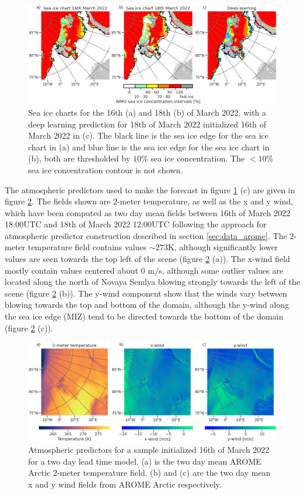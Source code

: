 \documentclass[../main/thesis.tex]{subfiles}
\begin{document}
\begin{figure}
    \centering
    \includegraphics[width=\textwidth]{predictions}
    \caption{\label{fig:case_preds}Sea ice charts for the 16th (a) and 18th (b) of March 2022, with a deep learning prediction for 18th of March 2022 initialized 16th of March 2022 in (c). The black line is the sea ice edge for the sea ice chart in (a) and blue line is the sea ice edge for the sea ice chart in (b), both are thresholded by $10\%$ sea ice concentration. The $<10\%$ sea ice concentration contour is not shown.}
\end{figure}

The atmospheric predictors used to make the forecast in figure \ref{fig:case_preds} (c) are given in figure \ref{fig:case_atmos}. The fields shown are 2-meter temperature, as well as the x and y wind, which have been computed as two day mean fields between 16th of March 2022 18:00UTC and 18th of March 2022 12:00UTC following the approach for atmospheric predictor construction described in section \ref{sec:data_arome}. The 2-meter temperature field contains values $\sim 273$K, although significantly lower values are seen towards the top left of the scene (figure \ref{fig:case_atmos} (a)). The x-wind field mostly contain values centered about 0 m/s, although some outlier values are located along the north of Novaya Semlya blowing strongly towards the left of the scene (figure \ref{fig:case_atmos} (b)). The y-wind component show that the winds vary between blowing towards the top and bottom of the domain, although the y-wind along the sea ice edge (MIZ) tend to be directed towards the bottom of the domain (figure \ref{fig:case_atmos} (c)).

\begin{figure}
    \centering
    \includegraphics[width=\textwidth]{atmosphere}
    \caption{\label{fig:case_atmos}Atmospheric predictors for a sample initialized 16th of March 2022 for a two day lead time model. (a) is the two day mean AROME Arctic 2-meter temperature field. (b) and (c) are the two day mean x and y wind fields from AROME Arctic respectively.}
\end{figure}
\end{document}
